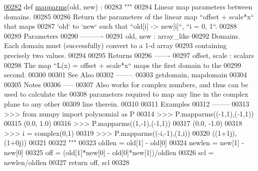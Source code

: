 \begin{DoxyCode}
\hypertarget{namespacepyneb_1_1utils_1_1polyutils_l00282}{}\hyperlink{namespacepyneb_1_1utils_1_1polyutils_a3621b172891db0806163f72f22e3723b}{00282} \textcolor{keyword}{def }\hyperlink{namespacepyneb_1_1utils_1_1polyutils_a3621b172891db0806163f72f22e3723b}{mapparms}(old, new) :
00283     \textcolor{stringliteral}{"""}
00284 \textcolor{stringliteral}{    Linear map parameters between domains.}
00285 \textcolor{stringliteral}{}
00286 \textcolor{stringliteral}{    Return the parameters of the linear map ``offset + scale*x`` that maps}
00287 \textcolor{stringliteral}{    `old` to `new` such that ``old[i] -> new[i]``, ``i = 0, 1``.}
00288 \textcolor{stringliteral}{}
00289 \textcolor{stringliteral}{    Parameters}
00290 \textcolor{stringliteral}{    ----------}
00291 \textcolor{stringliteral}{    old, new : array\_like}
00292 \textcolor{stringliteral}{        Domains. Each domain must (successfully) convert to a 1-d array}
00293 \textcolor{stringliteral}{        containing precisely two values.}
00294 \textcolor{stringliteral}{}
00295 \textcolor{stringliteral}{    Returns}
00296 \textcolor{stringliteral}{    -------}
00297 \textcolor{stringliteral}{    offset, scale : scalars}
00298 \textcolor{stringliteral}{        The map ``L(x) = offset + scale*x`` maps the first domain to the}
00299 \textcolor{stringliteral}{        second.}
00300 \textcolor{stringliteral}{}
00301 \textcolor{stringliteral}{    See Also}
00302 \textcolor{stringliteral}{    --------}
00303 \textcolor{stringliteral}{    getdomain, mapdomain}
00304 \textcolor{stringliteral}{}
00305 \textcolor{stringliteral}{    Notes}
00306 \textcolor{stringliteral}{    -----}
00307 \textcolor{stringliteral}{    Also works for complex numbers, and thus can be used to calculate the}
00308 \textcolor{stringliteral}{    parameters required to map any line in the complex plane to any other}
00309 \textcolor{stringliteral}{    line therein.}
00310 \textcolor{stringliteral}{}
00311 \textcolor{stringliteral}{    Examples}
00312 \textcolor{stringliteral}{    --------}
00313 \textcolor{stringliteral}{    >>> from numpy import polynomial as P}
00314 \textcolor{stringliteral}{    >>> P.mapparms((-1,1),(-1,1))}
00315 \textcolor{stringliteral}{    (0.0, 1.0)}
00316 \textcolor{stringliteral}{    >>> P.mapparms((1,-1),(-1,1))}
00317 \textcolor{stringliteral}{    (0.0, -1.0)}
00318 \textcolor{stringliteral}{    >>> i = complex(0,1)}
00319 \textcolor{stringliteral}{    >>> P.mapparms((-i,-1),(1,i))}
00320 \textcolor{stringliteral}{    ((1+1j), (1+0j))}
00321 \textcolor{stringliteral}{}
00322 \textcolor{stringliteral}{    """}
00323     oldlen = old[1] - old[0]
00324     newlen = new[1] - new[0]
00325     off = (old[1]*new[0] - old[0]*new[1])/oldlen
00326     scl = newlen/oldlen
00327     \textcolor{keywordflow}{return} off, scl
00328 
\end{DoxyCode}
\hypertarget{namespacepyneb_1_1utils_1_1polyutils_a505e3038cfd08b7f444ecca2234daa46}{}
